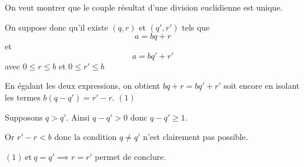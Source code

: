 \documentclass[12pt,french,a4paper]{scrartcl}
\begin{document}
On veut montrer que le couple résultat d'une division euclidienne est
unique.

On suppose donc qu'il existe $(q,r)$ et $(q',r')$ tels que \[ a = bq +r
\] et \[a = bq' + r'\] avec $0 \leqslant r \leq b$ et $0 \leqslant r'
\leq b$

En égalant les deux expressions, on obtient $bq + r = bq' + r'$ soit
encore en isolant les termes $b(q -q') = r' - r$. \hfill $(1)$

Supposons $q > q'$. Ainsi $q - q' > 0$ donc $q - q' \geqslant 1$.

Or $r' -r < b$ donc la condition $q \neq q'$ n'est clairement pas
possible.

$(1) \ \text{et}\ q = q' \implies r = r'$ permet de conclure.
\end{document}
